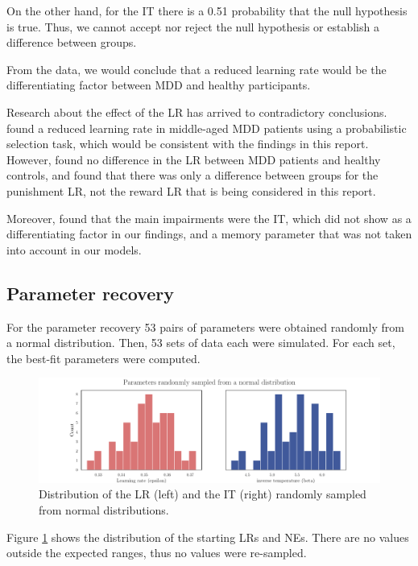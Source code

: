 \documentclass[12pt]{article}
\begin{document}
On the other hand, for the IT there is a 0.51 probability that the null hypothesis is true. Thus, we cannot accept nor reject the null hypothesis or establish a difference between groups.

From the data, we would conclude that a reduced learning rate would be the differentiating factor between MDD and healthy participants.

Research about the effect of the LR has arrived to contradictory conclusions. \cite{chase2010approach} found a reduced learning rate in middle-aged MDD patients using a probabilistic selection task, which would be consistent with the findings in this report. However, \cite{gradin} found no difference in the LR between MDD patients and healthy controls, and \cite{dombrovski2010reward} found that there was only a difference between groups for the punishment LR, not the reward LR that is being considered in this report.

Moreover, \cite{series} found that the main impairments were the IT, which did not show as a differentiating factor in our findings, and a memory parameter that was not taken into account in our models.

\subsection{Parameter recovery}
\label{sec:recovery}

For the parameter recovery 53 pairs of parameters were obtained randomly from a normal distribution. Then, 53 sets of data each were simulated. For each set, the best-fit parameters were computed.

\begin{figure}[h!]
	\centering
	\hspace*{-0.6in}
	\includegraphics[width=1.15\linewidth]{figures/2.5.0.pdf}
	\caption{Distribution of the LR (left) and the IT (right) randomly sampled from normal distributions.}
	\label{fig:2.5.0}
\end{figure}


Figure \ref{fig:2.5.0} shows the distribution of the starting LRs and NEs. There are no values outside the expected ranges, thus no values were re-sampled.
\end{document}
